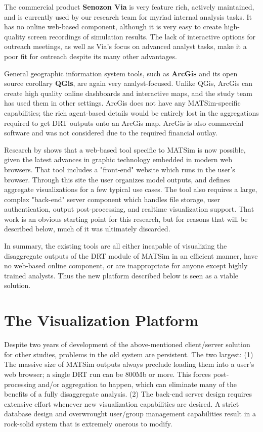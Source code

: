 The commercial product \textbf{Senozon Via} \cite{Rieser2015SenozonViaInBook} is very feature rich, actively maintained, and is currently used by our research team for myriad internal analysis tasks. It has no online web-based component, although it is very easy to create high-quality screen recordings of simulation results. The lack of interactive options for outreach meetings, as well as Via's focus on advanced analyst tasks, make it a poor fit for outreach despite its many other advantages.

General geographic information system tools, such as \textbf{ArcGis} and its open source corollary \textbf{QGis}, are again very analyst-focused. Unlike QGis, ArcGis can create high quality online dashboards and interactive maps, and the study team has used them in other settings. ArcGis does not have any MATSim-specific capabilities; the rich agent-based details would be entirely lost in the aggregations required to get DRT outputs onto an ArcGis map. ArcGis is also commercial software and was not considered due to the required financial outlay.

Research by \citet{CharltonLaudan2020WebBasedVisualization} shows that a web-based tool specific to MATSim is now possible, given the latest advances in graphic technology embedded in modern web browsers. That tool includes a "front-end" website which runs in the user's browser. Through this site the user organizes model outputs, and defines aggregate visualizations for a few typical use cases. The tool also requires a large, complex "back-end" server component which handles file storage, user authentication, output post-processing, and realtime visualization support. That work is an obvious starting point for this research, but for reasons that will be described below, much of it was ultimately discarded.

In summary, the existing tools are all either incapable of visualizing the disaggregate outputs of the DRT module of MATSim in an efficient manner, have no web-based online component, or are inappropriate for anyone except highly trained analysts. Thus the new platform described below is seen as a viable solution.

\section{The Visualization Platform}
\label{platform}

Despite two years of development of the above-mentioned client/server solution for other studies, problems in the old system are persistent. The two largest: (1) The massive size of MATSim outputs always preclude loading them into a user's web browser; a single DRT run can be 800Mb or more. This forces post-processing and/or aggregation to happen, which can eliminate many of the benefits of a fully disaggregate analysis. (2) The back-end server design requires extensive effort whenever new visualization capabilities are desired. A strict database design and overwrought user/group management capabilities result in a rock-solid system that is extremely onerous to modify.

